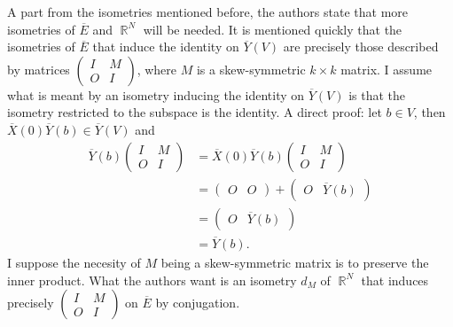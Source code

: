 \documentclass[a4paper]{article}
\DeclareMathOperator{\R}{\mathbb{R}}
\begin{document}
  A part from the isometries mentioned before, the authors
  state that more isometries of $\overline{E}$ and $\R^{N}$
  will be needed. It is mentioned quickly that the
  isometries of $\overline{E}$ that induce the identity on
  $\overline{Y}(V)$ are precisely those described by
  matrices $\begin{pmatrix} I & M \\ O & I \end{pmatrix}$,
  where $M$ is a skew-symmetric $k \times k$ matrix. I
  assume what is meant by an isometry inducing the identity
  on $\overline{Y}(V)$ is that the isometry restricted to
  the subspace is the identity. A direct proof: let $b \in
  V$, then $\overline{X}(0)\overline{Y}(b) \in
  \overline{Y}(V)$ and
  \begin{align*}
    \overline{Y}(b) 
    \begin{pmatrix} I & M \\ O & I \end{pmatrix}
    &= \overline{X}(0)\overline{Y}(b) 
    \begin{pmatrix} I & M \\ O & I \end{pmatrix} \\
    &= 
    \begin{pmatrix} O & O  \end{pmatrix} +
    \begin{pmatrix} O & \overline{Y}(b) \end{pmatrix} \\
    &= \begin{pmatrix} O & \overline{Y}(b) \end{pmatrix}  \\
    &= \overline{Y}(b).
  \end{align*}
  I suppose the necesity of $M$ being a skew-symmetric
  matrix is to preserve the inner product. What the authors
  want is an isometry $d_M$ of $\R^{N}$ that induces
  precisely $\begin{pmatrix} I & M \\ O & I \end{pmatrix}$ 
  on $\overline{E}$ by conjugation.
\end{document}
